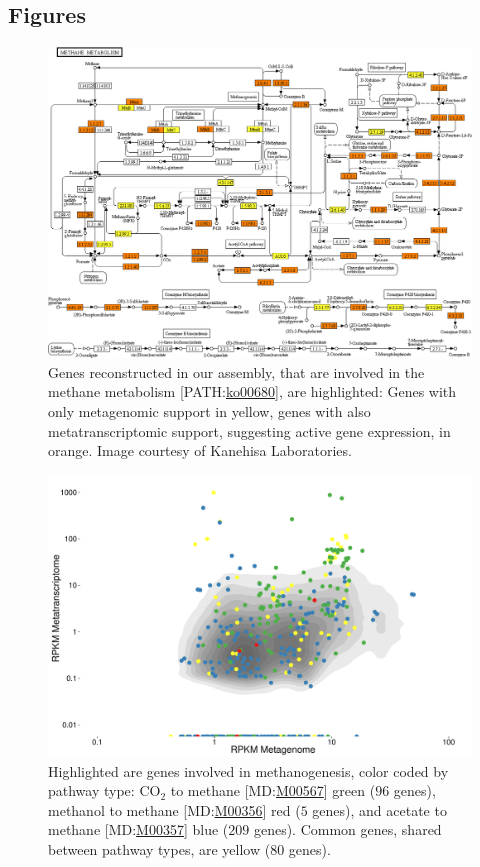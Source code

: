 \documentclass{bmcart}
\begin{document}
\begin{backmatter}
\section*{Figures}
\begin{figure}[h!]
\centering
\includegraphics[width=.9\textwidth]{map00680_cropped.png}
\caption{ Genes reconstructed in our assembly, that are involved in the methane metabolism [PATH:\href{http://www.genome.jp/kegg-bin/show_pathway?ko00680}{ko00680}], are highlighted: Genes with only metagenomic support in yellow, genes with also metatranscriptomic support, suggesting active gene expression, in orange.
Image courtesy of Kanehisa Laboratories.}
\label{fPathway}
\end{figure}
\begin{figure}[h!]
\centering
\includegraphics[width=.9\textwidth]{Rplot.pdf}
\caption{ Highlighted are genes involved in methanogenesis, color coded by pathway type: CO$_{\text{2}}$ to methane [MD:\href{http://www.kegg.jp/kegg-bin/show_module?M00567}{M00567}] green ($96$ genes), methanol to methane [MD:\href{http://www.kegg.jp/kegg-bin/show_module?M00356}{M00356}] red ($5$ genes), and acetate to methane [MD:\href{http://www.kegg.jp/kegg-bin/show_module?M00357}{M00357}] blue ($209$ genes). Common genes, shared between pathway types, are yellow ($80$ genes).}
\label{fCoverage}
\end{figure}


\end{backmatter}
\end{document}
